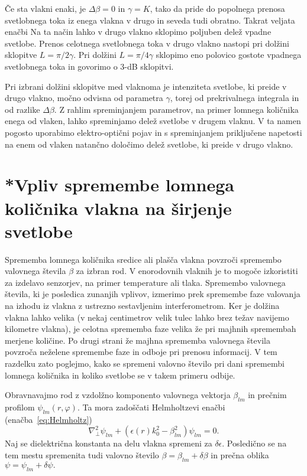 Če sta vlakni 
enaki, je $\Delta \beta = 0$ in $\gamma = K$, tako da pride do popolnega prenosa
svetlobnega toka iz enega vlakna v drugo in seveda tudi obratno.
Takrat veljata enačbi
Na ta način lahko v drugo vlakno sklopimo poljuben delež vpadne svetlobe. 
Prenos celotnega svetlobnega toka v drugo vlakno nastopi pri dolžini sklopitve $L = \pi/2 \gamma$. 
Pri dolžini $L = \pi/4 \gamma$ sklopimo eno polovico gostote vpadnega svetlobnega toka in govorimo o 3-dB sklopitvi. 

\begin{remark}
 Pri izbrani dolžini sklopitve med vlaknoma je intenziteta svetlobe, ki preide v drugo vlakno,
 močno odvisna od parametra $\gamma$, torej od prekrivalnega integrala in od razlike $\Delta \beta$. 
 Z rahlim spreminjanjem parametrov, na primer lomnega 
 količnika enega od vlaken, lahko spreminjamo delež svetlobe v drugem vlaknu. V ta 
 namen pogosto uporabimo elektro-optični pojav in s spreminjanjem priključene napetosti na
 enem od vlaken natančno določimo delež svetlobe, ki preide v drugo vlakno. 
\end{remark}

\section{*Vpliv spremembe lomnega količnika vlakna na širjenje svetlobe}
Sprememba lomnega količnika sredice ali plašča vlakna povzroči spremembo
valovnega števila $\beta$ za izbran rod. V enorodovnih vlaknih je to
mogoče izkoristiti za izdelavo senzorjev, na primer temperature ali
tlaka. Spremembo valovnega števila, ki je posledica zunanjih vplivov,
izmerimo prek spremembe faze valovanja na izhodu iz vlakna
z ustrezno sestavljenim interferometrom. Ker je dolžina vlakna lahko
velika (v nekaj centimetrov velik tulec lahko brez težav navijemo
kilometre vlakna), je celotna sprememba faze velika že pri majhnih
spremembah merjene količine. Po drugi strani že majhna sprememba 
valovnega števila povzroča neželene spremembe faze in odboje pri prenosu 
informacij.
V tem razdelku zato poglejmo, kako se spremeni valovno število pri
dani spremembi lomnega količnika in koliko svetlobe se v takem primeru odbije.

Obravnavajmo rod z vzdolžno komponento valovnega vektorja $\beta_{lm}$ in prečnim
profilom $\psi_{lm}\left(r,\varphi\right)\!.$ Ta mora zadoščati Helmholtzevi enačbi 
(enačba~\ref{eq:Helmholtz})
\begin{equation}
\nabla_{\bot}^{2}\psi_{lm}+\left(\epsilon(r)k_{0}^{2}-\beta_{lm}^{2}\right)\psi_{lm}=0.
\label{9.22}
\end{equation}
Naj se dielektrična konstanta na delu vlakna spremeni za $\delta\epsilon.$
Posledično se na tem mestu spremenita tudi valovno število $\beta=\beta_{lm}+\delta\beta$
in prečna oblika $\psi=\psi_{lm}+\delta\psi.$ 

